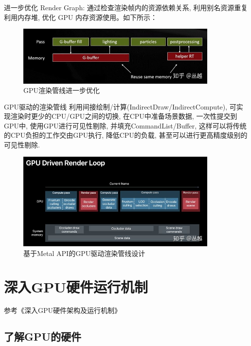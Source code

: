\documentclass[UTF8]{ctexart}
\begin{document}
进一步优化 Render Graph:
通过检查渲染帧内的资源依赖关系, 利用别名资源重复利用内存堆, 优化 GPU 内存资源使用。如下所示：

\begin{figure}[H]
  \includegraphics[width=10cm]{rendering_pipeline_design_opt.jpg}
  \centering
  \caption{GPU渲染管线进一步优化}
  \label{fig:gpu_rendering_pipeline_optimization}
\end{figure}

GPU驱动的渲染管线
利用间接绘制/计算(IndirectDraw/IndirectCompute), 可实现渲染时更少的CPU/GPU之间的切换, 在CPU中准备场景数据, 一次性提交到GPU中, 使用GPU进行可见性剔除, 并填充CommandList/Buffer, 这样可以将传统的CPU负担的工作交由GPU执行, 降低CPU的负载, 甚至可以进行更高精度级别的可见性剔除.
\begin{figure}[H]
  \includegraphics[width=10cm]{gpu_driven_rendering.jpg}
  \centering
  \caption{基于Metal API的GPU驱动渲染管线设计}
  \label{fig:gpu_driven_rendering}
\end{figure}

\section{深入GPU硬件运行机制}
参考《深入GPU硬件架构及运行机制》\cite{deepIntoGPU}
\subsection{了解GPU的硬件}
\end{document}
